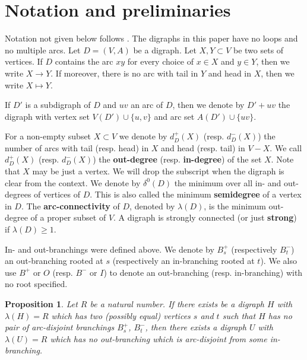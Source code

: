 \documentclass{article}
\newtheorem{proposition}[theorem]{Proposition}
\theoremstyle{definition}
\newcommand{\AY}[1]{{#1}}
\newcommand{\ra}{\rightarrow}
\newcommand{\2}{\vspace{0.2cm}}
\begin{document}
\section{Notation and preliminaries}

Notation not given below follows \cite{bang2018,bang2009}. The
digraphs in this paper have no loops and no multiple arcs.  Let
$D=(V,A)$ be a digraph.  Let $X,Y\subset V$ be two sets of
vertices. If $D$ contains the arc $xy$ for every choice of $x\in X$
and $y\in Y$, then we write $X\ra Y$.  If moreover, there is no arc
with tail in $Y$ and head in $X$, then we write $X\mapsto Y$.

If $D'$ is a subdigraph of $D$ and $uv$ an arc of $D$, then we denote
by $D'+uv$ the digraph with vertex set $V(D')\cup \{u,v\}$ and arc set
$A(D')\cup \{uv\}$.

For a non-empty subset $X\subset V$ we denote by $d_D^+(X)$
(resp. $d_D^-(X)$) the number of arcs with tail (resp. head) in $X$ and head
(resp. tail) in $V-X$. We call $d_D^+(X)$ (resp. $d_D^-(X)$) the {\bf out-degree}
(resp. {\bf in-degree}) of the set $X$. Note that $X$ may be just a
vertex. We will drop the subscript when the digraph is clear from the
context. We denote by $\delta^0(D)$ the minimum over all in- and
out-degrees of vertices of $D$. This is also called the minimum {\bf
  semidegree} of a vertex in $D$.  The {\bf arc-connectivity} of $D$,
denoted by $\lambda{}(D)$, is the minimum out-degree of a proper subset
of $V$. A digraph is strongly connected (or just {\bf strong}) if
$\lambda{}(D)\geq 1$.

In- and out-branchings were defined above. We denote by $B_s^+$
\AY{(respectively $B_t^-$) an out-branching rooted at $s$
(respectively an in-branching rooted at $t$)}. We also use $B^+$ or $O$
(resp. $B^-$ or $I$) to denote an out-branching (resp. in-branching) with no root
specified.  
\begin{proposition}
  \label{prop:noBranch}
  Let $R$ be a natural number. If there exists be a digraph $H$ with
  $\lambda{}(H)=R$ which has two (possibly equal) vertices $s$ and $t$
  such that $H$ has no pair of arc-disjoint branchings $B_s^+$, $B_t^-$,
  then there exists a digraph $U$ with $\lambda{}(U)=R$ which has no
  out-branching which is arc-disjoint from some in-branching.
\end{proposition}
\end{document}
